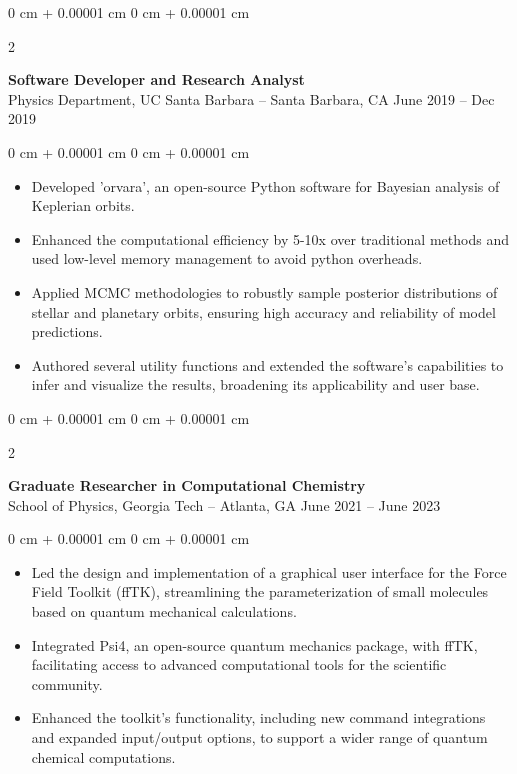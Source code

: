 \documentclass[10pt, letterpaper]{article}
\newenvironment{highlights}{
    \begin{itemize}[
        topsep=0.10 cm,
        parsep=0.10 cm,
        partopsep=0pt,
        itemsep=0pt,
        leftmargin=0 cm + 10pt
    ]
}{
    \end{itemize}
} %
\newenvironment{onecolentry}{
    \begin{adjustwidth}{
        0 cm + 0.00001 cm
    }{
        0 cm + 0.00001 cm
    }
}{
    \end{adjustwidth}
} %
\newenvironment{twocolentry}[2][]{
    \onecolentry
    \def\secondColumn{#2}
    \setcolumnwidth{\fill, 4.5 cm}
    \begin{paracol}{2}
}{
    \switchcolumn \raggedleft \secondColumn
    \end{paracol}
    \endonecolentry
} %
\begin{document}
        \vspace{0.2 cm}

        \begin{twocolentry}{
            June 2019 – Dec 2019
        }
            \textbf{Software Developer and Research Analyst} \\ Physics Department, UC Santa Barbara -- Santa Barbara, CA\end{twocolentry}

        \vspace{0.10 cm}
        \begin{onecolentry}
            \begin{highlights}
                \item Developed 'orvara', an open-source Python software for Bayesian analysis of Keplerian orbits.
                \item Enhanced the computational efficiency by 5-10x over traditional methods and used low-level memory management to avoid python overheads.
                \item Applied MCMC methodologies to robustly sample posterior distributions of stellar and planetary orbits, ensuring high accuracy and reliability of model predictions.
                \item Authored several utility functions and extended the software’s capabilities to infer and visualize the results, broadening its applicability and user base.
            \end{highlights}
        \end{onecolentry}


        \vspace{0.2 cm}

        \begin{twocolentry}{
            June 2021 – June 2023
        }
            \textbf{Graduate Researcher in Computational Chemistry} \\ School of Physics, Georgia Tech -- Atlanta, GA\end{twocolentry}

        \vspace{0.10 cm}
        \begin{onecolentry}
            \begin{highlights}
                \item Led the design and implementation of a graphical user interface for the Force Field Toolkit (ffTK), streamlining the parameterization of small molecules based on quantum mechanical calculations.
                \item Integrated Psi4, an open-source quantum mechanics package, with ffTK, facilitating access to advanced computational tools for the scientific community.
                \item Enhanced the toolkit's functionality, including new command integrations and expanded input/output options, to support a wider range of quantum chemical computations.
            \end{highlights}
        \end{onecolentry}
\end{document}
